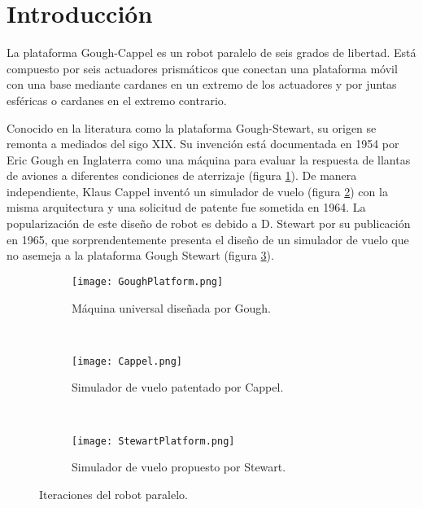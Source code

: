 \section{Introducción}

La plataforma Gough-Cappel es un robot paralelo de seis grados de libertad.
Está compuesto por seis actuadores prismáticos que conectan una plataforma
móvil con una base mediante cardanes en un extremo de los actuadores y por
juntas esféricas o cardanes en el extremo contrario. 

Conocido en la literatura como la 
plataforma Gough-Stewart, su origen se remonta a mediados del sigo XIX.
Su invención está documentada en 1954 por Eric Gough 
\cite{gough} en Inglaterra como una máquina para 
evaluar la respuesta de llantas de aviones a diferentes 
condiciones de aterrizaje (figura \ref{fig: gough robot}). 
De manera independiente, Klaus Cappel inventó un simulador de vuelo (figura \ref{fig: cappel robot})
con la misma arquitectura y una solicitud de patente 
fue sometida en 1964.
La popularización de este diseño de robot es debido a D. Stewart 
por su publicación en 1965, que sorprendentemente presenta el
diseño de un simulador de vuelo que no asemeja a la 
plataforma Gough Stewart (figura \ref{fig: stewart robot}).



\begin{figure}[htb!]
    \centering
    \begin{subfigure}[b]{0.3\textwidth}
        \texttt{[image: GoughPlatform.png]}
        \caption{Máquina universal diseñada por Gough. \cite{stewart}}
        \label{fig: gough robot}
    \end{subfigure}
    ~ %
    \begin{subfigure}[b]{0.3\textwidth}
         \texttt{[image: Cappel.png]}
        \caption{Simulador de vuelo patentado por Cappel. \cite{cappel}}
        \label{fig: cappel robot}
    \end{subfigure}
    ~ %
    \begin{subfigure}[b]{0.3\textwidth}
        \texttt{[image: StewartPlatform.png]}
        \caption{Simulador de vuelo propuesto por Stewart. \cite{stewart}}
        \label{fig: stewart robot}
    \end{subfigure}
    \caption{Iteraciones del robot paralelo.}\label{fig: parallel robots}
\end{figure}

